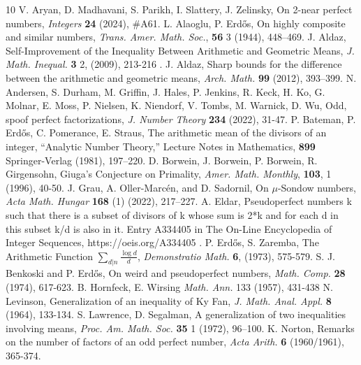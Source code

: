 \documentclass{article}
\begin{document}
\begin{thebibliography}{10}
 V. Aryan, D. Madhavani,  S. Parikh,  I. Slattery, J. Zelinsky,  On 2-near perfect numbers, \textit{Integers} \textbf{24} (2024), \#A61.
 L. Alaoglu, P. Erd\H{o}s,  On highly composite and similar numbers, \textit{Trans. Amer. Math. Soc.}, {\bf 56} 3  (1944), 448–469.
 J. Aldaz, Self-Improvement of the Inequality Between Arithmetic and Geometric Means, \textit{ J. Math. Inequal.} {\bf 3} 2, (2009), 213-216 . %
  J. Aldaz, Sharp bounds for the difference between the arithmetic and geometric means, \textit{Arch. Math.} {\bf 99}  (2012), 393–399.
 N. Andersen, S. Durham, M. Griffin, J. Hales, P. Jenkins,  R. Keck, H. Ko,  G. Molnar, E. Moss, P. Nielsen,  K. Niendorf,  V. Tombs, M. Warnick, D. Wu,  Odd, spoof perfect factorizations,
\textit{J. Number Theory} \textbf{234} (2022), 31-47.
 P. Bateman, P. Erd\H{o}s, C. Pomerance, E. Straus, The arithmetic mean of the divisors of an integer, ``Analytic Number Theory,'' Lecture Notes in Mathematics, {\bf 899} Springer-Verlag (1981), 197--220.
 D. Borwein, J. Borwein, P.  Borwein, R. Girgensohn, Giuga's Conjecture on Primality, \textit{Amer. Math. Monthly}, {\bf 103},  1 (1996), 40-50.
 J.  Grau, A.  Oller-Marc\'en, and D. Sadornil, On $\mu$-Sondow numbers, \textit{Acta Math. Hungar} {\bf 168} (1) (2022), 217–227.
 A. Eldar, Pseudoperfect numbers k such that there is a subset of divisors of k whose sum is 2*k and for each d in this subset k/d is also in it. Entry A334405 in The On-Line Encyclopedia of Integer Sequences, https://oeis.org/A334405  . 
  P. Erd\H{o}s, S. Zaremba, The Arithmetic Function $\sum_{d|n}\frac{\log d}{d}$, \textit{Demonstratio Math.} {\bf 6}, (1973), 575-579.
 S. J. Benkoski and P. Erd\H{o}s, On weird and pseudoperfect numbers, \textit{Math. Comp.} {\bf 28} (1974), 617-623.  
 B. Hornfeck, E. Wirsing \textit{Math. Ann.} 133 (1957), 431-438
 N. Levinson, Generalization of an inequality of Ky Fan, \textit{J. Math. Anal. Appl.} {\bf 8} (1964), 133-134.
 S. Lawrence, D. Segalman, A generalization of two inequalities involving means, {\it Proc. Am. Math. Soc.} {\bf 35} 1 (1972), 96--100.
 K. Norton,   Remarks on the number of factors of an odd perfect number, {\it Acta Arith.} {\bf 6} (1960/1961), 365-374.

\end{thebibliography}
\end{document}

